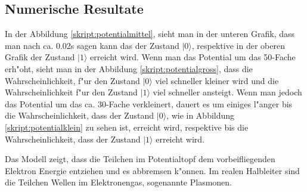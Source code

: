 \begin{refsection}
\subsection{Numerische Resultate}
In der Abbildung \ref{skript:potentialmittel}, sieht man in der unteren
Grafik, dass man nach ca. 0.02s sagen kann das der Zustand $|0\rangle$, 
respektive in der oberen Grafik der Zustand $|1\rangle$ erreicht wird.
Wenn man das Potential um das 50-Fache erh"oht, sieht man in der Abbildung
\ref{skript:potentialgross}, dass die Wahrscheinlichkeit, f"ur  den Zustand
$|0\rangle$ viel schneller kleiner wird und die Wahrscheinlichkeit f"ur den
Zustand $|1\rangle$ viel schneller ansteigt.
Wenn man jedoch das Potential um das ca. 30-Fache verkleinert, dauert es
um einiges l"anger bis die Wahrscheinlichkeit, dass der Zustand $|0\rangle$,
wie in Abbildung \ref{skript:potentialklein} zu sehen ist, erreicht wird,
respektive bis die Wahrscheinlichkeit, dass der Zustand $|1\rangle$ erreicht
wird.

Das Modell zeigt, dass die Teilchen im Potentialtopf dem vorbeifliegenden
Elektron Energie entziehen und es abbremsen k"onnen.
Im realen Halbleiter sind die Teilchen Wellen im Elektronengas,
sogenannte Plasmonen.


\printbibliography[heading=subbibliography]
\end{refsection}
